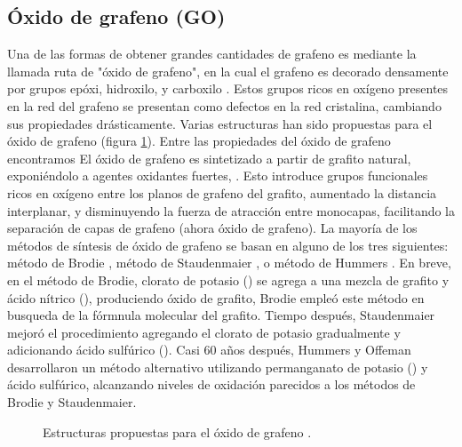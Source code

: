 \subsection{Óxido de grafeno (GO)}
Una de las formas de obtener grandes cantidades de grafeno es mediante la llamada ruta de "óxido de grafeno", en la cual el grafeno es decorado densamente por grupos epóxi, hidroxilo, y carboxilo \citep{Dreyer2010}. Estos grupos ricos en oxígeno presentes en la red del grafeno se presentan como defectos en la red cristalina, cambiando sus propiedades drásticamente. Varias estructuras han sido propuestas para el óxido de grafeno (figura \ref{fig:GO_structure}). Entre las propiedades del óxido de grafeno encontramos
El óxido de grafeno es sintetizado a partir de grafito natural, exponiéndolo a agentes oxidantes fuertes,  . Esto introduce grupos funcionales ricos en oxígeno entre los planos de grafeno del grafito, aumentado la distancia interplanar, y disminuyendo la fuerza de atracción entre monocapas, facilitando la separación de capas de grafeno (ahora óxido de grafeno). La mayoría de los métodos de síntesis de óxido de grafeno se basan en alguno de los tres siguientes: método de Brodie \citep{Brodie1859}, método de Staudenmaier \citep{Staudenmaier1898}, o método de Hummers \citep{Hummers1958}. En breve, en el método de Brodie, clorato de potasio () se agrega a una mezcla de grafito y ácido nítrico (), produciendo óxido de grafito, Brodie empleó este método en busqueda de la fórmnula molecular del grafito. Tiempo después, Staudenmaier mejoró el procedimiento agregando el clorato de potasio gradualmente y adicionando ácido sulfúrico (). Casi 60 años después, Hummers y Offeman desarrollaron un método alternativo utilizando permanganato de potasio () y ácido sulfúrico, alcanzando niveles de oxidación parecidos a los métodos de Brodie y Staudenmaier.

\begin{figure}
	\centering
	\caption[Estructura de óxido de grafeno]{Estructuras propuestas para el óxido de grafeno \citep{Dreyer2010}.}
	\label{fig:GO_structure}
\end{figure}


